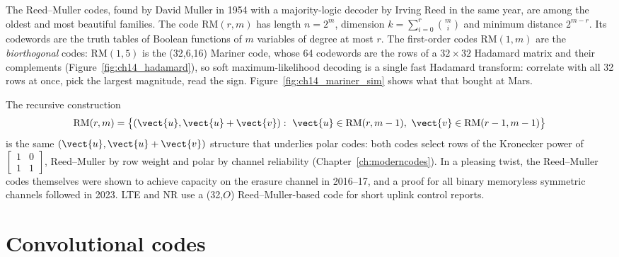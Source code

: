 The Reed--Muller codes, found by David Muller in 1954 with a majority-logic decoder by Irving Reed
in the same year, are among the oldest and most beautiful families. The code $\mathrm{RM}(r,m)$ has
length $n=2^m$, dimension $k=\sum_{i=0}^{r}\binom mi$ and minimum distance $2^{m-r}$. Its codewords are
the truth tables of Boolean functions of $m$ variables of degree at most $r$. The first-order codes
$\mathrm{RM}(1,m)$ are the \emph{biorthogonal} codes: $\mathrm{RM}(1,5)$ is the (32,6,16) Mariner code,
whose 64 codewords are the rows of a $32\times32$ Hadamard matrix and their complements
(Figure~\ref{fig:ch14_hadamard}), so soft maximum-likelihood decoding is a single fast Hadamard
transform: correlate with all 32 rows at once, pick the largest magnitude, read the sign.
Figure~\ref{fig:ch14_mariner_sim} shows what that bought at Mars.


The recursive construction
\begin{equation}
\mathrm{RM}(r,m)=\big\{(\vect{u},\vect{u}+\vect{v}):\ \vect{u}\in\mathrm{RM}(r,m-1),\ \vect{v}\in\mathrm{RM}(r-1,m-1)\big\}
\label{eq:ch14:uuv}
\end{equation}
is the same $(\vect{u},\vect{u}+\vect{v})$ structure that underlies polar codes: both codes select rows of
the Kronecker power of $\left[\begin{smallmatrix}1&0\\1&1\end{smallmatrix}\right]$, Reed--Muller by
row weight and polar by channel reliability (Chapter~\ref{ch:moderncodes}). In a pleasing twist, the
Reed--Muller codes themselves were shown to achieve capacity on the erasure channel in 2016--17, and a
proof for all binary memoryless symmetric channels followed in 2023. LTE and NR use a (32,$O$)
Reed--Muller-based code for short uplink control reports.

\section{Convolutional codes}
\label{sec:ch14:conv}

